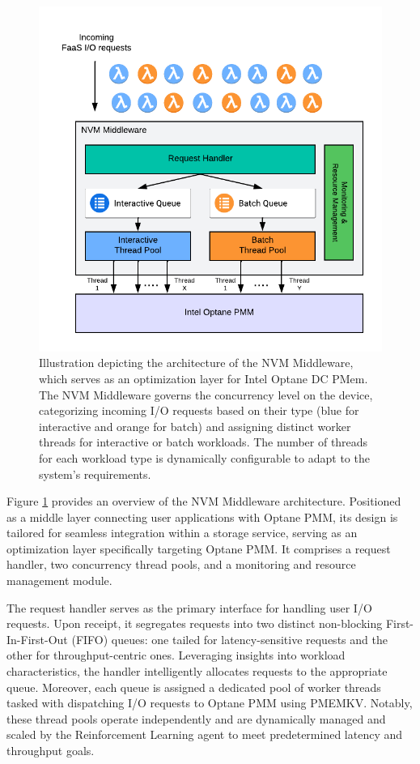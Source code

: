 \begin{figure}[ht]
  \centering
  \includegraphics[scale=1]{images/nvm_design.png}
  \caption[NVM Middleware Architecture]{Illustration depicting the architecture of the NVM Middleware, which serves as an optimization layer for Intel Optane DC PMem. The NVM Middleware governs the concurrency level on the device, categorizing incoming I/O requests based on their type (blue for interactive and orange for batch) and assigning distinct worker threads for interactive or batch workloads. The number of threads for each workload type is dynamically configurable to adapt to the system's requirements.}
  \label{fig:nvm_architecture}
\end{figure}

Figure \ref{fig:nvm_architecture} provides an overview of the NVM Middleware architecture. Positioned as a middle layer connecting user applications with Optane PMM, its design is tailored for seamless integration within a storage service, serving as an optimization layer specifically targeting Optane PMM. It comprises a request handler, two concurrency thread pools, and a monitoring and resource management module.

The request handler serves as the primary interface for handling user I/O requests. Upon receipt, it segregates requests into two distinct non-blocking First-In-First-Out (FIFO) queues: one tailed for latency-sensitive requests and the other for throughput-centric ones. Leveraging insights into workload characteristics, the handler intelligently allocates requests to the appropriate queue. Moreover, each queue is assigned a dedicated pool of worker threads tasked with dispatching I/O requests to Optane PMM using PMEMKV. Notably, these thread pools operate independently and are dynamically managed and scaled by the Reinforcement Learning agent to meet predetermined latency and throughput goals.

